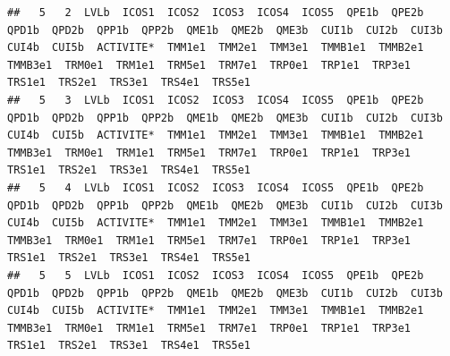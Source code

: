 \documentclass[11pt,a4paper, x11names]{article}\usepackage[]{graphicx}\usepackage[]{color}
\makeatletter
\newenvironment{kframe}{%
 \def\at@end@of@kframe{}%
 \ifinner\ifhmode%
  \def\at@end@of@kframe{\end{minipage}}%
  \begin{minipage}{\columnwidth}%
 \fi\fi%
 \def\FrameCommand##1{\hskip\@totalleftmargin \hskip-\fboxsep
 \colorbox{shadecolor}{##1}\hskip-\fboxsep
     \hskip-\linewidth \hskip-\@totalleftmargin \hskip\columnwidth}%
 \MakeFramed {\advance\hsize-\width
   \@totalleftmargin\z@ \linewidth\hsize
   \@setminipage}}%
 {\par\unskip\endMakeFramed%
 \at@end@of@kframe}
\newenvironment{knitrout}{}{} %
\makeatother
\begin{document}
\begin{knitrout}
\begin{kframe}
\begin{verbatim}
##   5   2  LVLb  ICOS1  ICOS2  ICOS3  ICOS4  ICOS5  QPE1b  QPE2b  QPD1b  QPD2b  QPP1b  QPP2b  QME1b  QME2b  QME3b  CUI1b  CUI2b  CUI3b  CUI4b  CUI5b  ACTIVITE*  TMM1e1  TMM2e1  TMM3e1  TMMB1e1  TMMB2e1  TMMB3e1  TRM0e1  TRM1e1  TRM5e1  TRM7e1  TRP0e1  TRP1e1  TRP3e1  TRS1e1  TRS2e1  TRS3e1  TRS4e1  TRS5e1
##   5   3  LVLb  ICOS1  ICOS2  ICOS3  ICOS4  ICOS5  QPE1b  QPE2b  QPD1b  QPD2b  QPP1b  QPP2b  QME1b  QME2b  QME3b  CUI1b  CUI2b  CUI3b  CUI4b  CUI5b  ACTIVITE*  TMM1e1  TMM2e1  TMM3e1  TMMB1e1  TMMB2e1  TMMB3e1  TRM0e1  TRM1e1  TRM5e1  TRM7e1  TRP0e1  TRP1e1  TRP3e1  TRS1e1  TRS2e1  TRS3e1  TRS4e1  TRS5e1
##   5   4  LVLb  ICOS1  ICOS2  ICOS3  ICOS4  ICOS5  QPE1b  QPE2b  QPD1b  QPD2b  QPP1b  QPP2b  QME1b  QME2b  QME3b  CUI1b  CUI2b  CUI3b  CUI4b  CUI5b  ACTIVITE*  TMM1e1  TMM2e1  TMM3e1  TMMB1e1  TMMB2e1  TMMB3e1  TRM0e1  TRM1e1  TRM5e1  TRM7e1  TRP0e1  TRP1e1  TRP3e1  TRS1e1  TRS2e1  TRS3e1  TRS4e1  TRS5e1
##   5   5  LVLb  ICOS1  ICOS2  ICOS3  ICOS4  ICOS5  QPE1b  QPE2b  QPD1b  QPD2b  QPP1b  QPP2b  QME1b  QME2b  QME3b  CUI1b  CUI2b  CUI3b  CUI4b  CUI5b  ACTIVITE*  TMM1e1  TMM2e1  TMM3e1  TMMB1e1  TMMB2e1  TMMB3e1  TRM0e1  TRM1e1  TRM5e1  TRM7e1  TRP0e1  TRP1e1  TRP3e1  TRS1e1  TRS2e1  TRS3e1  TRS4e1  TRS5e1
\end{verbatim}
\end{kframe}
\end{knitrout}
\end{document}
